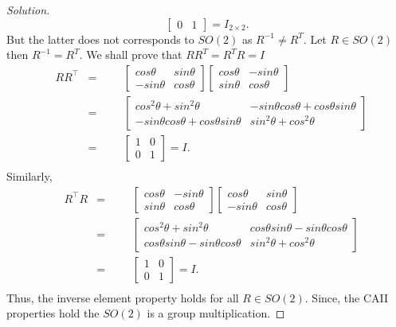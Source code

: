 \documentclass[12pt]{article}
\newenvironment{solution}{\begin{proof}[Solution]}{\end{proof}}
\begin{document}
\begin{solution}
\begin{equation*}
\begin{bmatrix}
0 & 1
\end{bmatrix} =I_{2\times 2}. 
\end{equation*}
But the latter does not corresponds to $SO(2)$ as $R^{-1} \neq R^{T}$. Let $R \in SO(2)$ then $R^{-1}= R^{T}$. We shall prove that $RR^{T}=R^{T}R=I$
\begin{equation*}
\begin{aligned}
& R R^\top
&  =
&&& \begin{bmatrix}
cos\theta & sin\theta \\
-sin\theta & cos\theta
\end{bmatrix}\begin{bmatrix}
cos\theta & -sin\theta \\
sin\theta & cos\theta
\end{bmatrix}\\
&&  =
&&& \begin{bmatrix}
cos^2\theta+sin^2\theta & -sin\theta cos\theta +cos\theta sin\theta \\
-sin\theta cos\theta+cos\theta sin\theta & sin^2\theta+cos^2\theta
\end{bmatrix}\\
&& =
&&& \begin{bmatrix}
1 & 0 \\
0 & 1
\end{bmatrix}=I.\\
\end{aligned}
\end{equation*}
Similarly,
\begin{equation*}
\begin{aligned}
& R^\top R 
&  =
&&& \begin{bmatrix}
cos\theta & -sin\theta \\
sin\theta & cos\theta
\end{bmatrix}\begin{bmatrix}
cos\theta & sin\theta \\
-sin\theta & cos\theta
\end{bmatrix}\\
&&  =
&&& \begin{bmatrix}
cos^2\theta+sin^2\theta & cos\theta sin\theta-sin\theta cos\theta \\
cos\theta sin\theta-sin\theta cos\theta & sin^2\theta+cos^2\theta
\end{bmatrix}\\
&& =
&&& \begin{bmatrix}
1 & 0 \\
0 & 1
\end{bmatrix}=I.\\
\end{aligned}
\end{equation*}
Thus, the inverse element property holds for all $R\in SO(2)$. Since, the CAII properties hold the $SO(2)$ is a group multiplication.


\end{solution}
\end{document}
